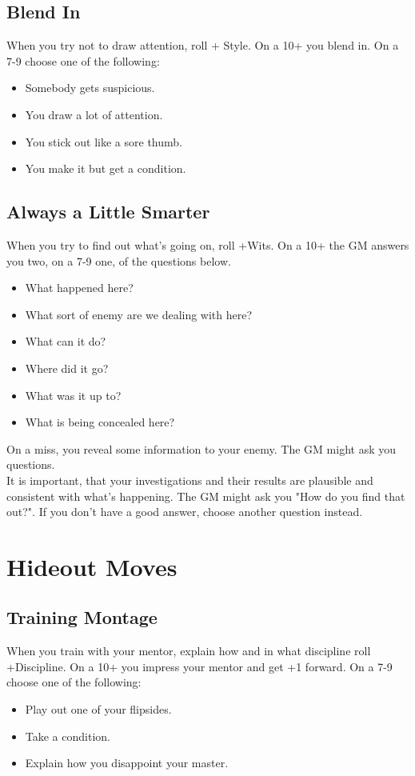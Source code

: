 \documentclass{book}
\begin{document}
\section*{Blend In}
When you try not to draw attention, roll + Style. On a 10+ you blend in. On a 7-9 choose one of the following:
\begin{itemize}
    \item Somebody gets suspicious.
    \item You draw a lot of attention.
    \item You stick out like a sore thumb.
    \item You make it but get a condition.
\end{itemize}

\section*{Always a Little Smarter}
When you try to find out what's going on, roll +Wits. On a 10+ the GM answers you two, on a 7-9 one, of the questions below.
\begin{itemize}
    \item What happened here?
    \item What sort of enemy are we dealing with here?
    \item What can it do?
    \item Where did it go?
    \item What was it up to?
    \item What is being concealed here?
\end{itemize}
On a miss, you reveal some information to your enemy. The GM might ask you questions.\\
It is important, that your investigations and their results are plausible and consistent with what's happening. The GM might ask you "How do you find that out?". If you don't have a good answer, choose another question instead.

\chapter*{Hideout Moves}
\section*{Training Montage}
When you train with your mentor, explain how and in what discipline roll +Discipline. On a 10+ you impress your mentor and get +1 forward. On a 7-9 choose one of the following:
\begin{itemize}
    \item Play out one of your flipsides.
    \item Take a condition.
    \item Explain how you disappoint your master.
\end{itemize}
\end{document}
